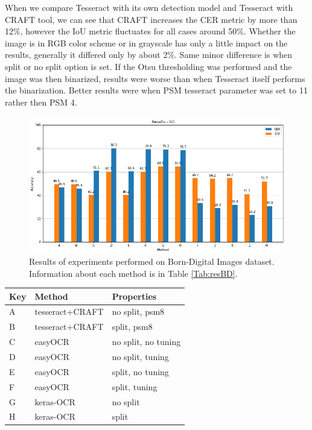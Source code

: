 When we compare Tesseract with its own detection model and Tesseract with CRAFT tool, we can see that CRAFT increases the CER metric by more than 12\%, however the IoU metric fluctuates for all cases around 50\%. Whether the image is in RGB color scheme or in grayscale has only a little impact on the results, generally it differed only by about 2\%. Same minor difference is when split or no split option is set. If the Otsu thresholding was performed and the image was then binarized, results were worse than when Tesseract itself performs the binarization. Better results were when PSM tesseract parameter was set to 11 rather then PSM 4.

{
\begin{figure}[hbtp!]
    \centering
    \includegraphics[width=\textwidth]{obrazky/grafy/resBD.png}
    \caption{Results of experiments performed on Born-Digital Images dataset. Information about each method is in Table \ref*{Tab:resBD}.}
    \label{Im:resBD}
\end{figure}
\begin{table}[!hbt]
    \centering
    \begin{tabular}{|l|l|l|}
    \hline
        Key & Method & Properties \\ \hline
        A & tesseract+CRAFT &  no split, psm8\\ 
        B & tesseract+CRAFT &  split, psm8\\ \hline
        C & easyOCR &  no split, no tuning\\ 
        D & easyOCR &  no split, tuning\\ 
        E & easyOCR &  split, no tuning\\ 
        F & easyOCR &  split, tuning\\ \hline
        G & keras-OCR &  no split\\ 
        H & keras-OCR &  split\\ \hline

\end{tabular}
\end{table}}
